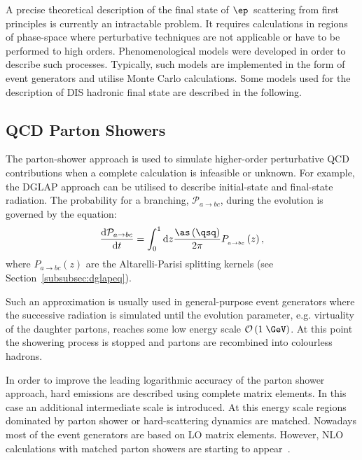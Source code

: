 A precise theoretical description of the final state of $\ep$~scattering from first principles is currently an intractable problem. It requires calculations in regions of phase-space where perturbative techniques are not applicable or have to be performed to high orders. Phenomenological models were developed in order to describe such processes. Typically, such models are implemented in the form of event generators and utilise Monte Carlo calculations. Some models used for the description of DIS hadronic final state are described in the following.
\subsection{QCD Parton Showers}
\label{sec:qcdpartonshower}
The parton-shower approach is used to simulate higher-order perturbative QCD contributions when a complete calculation is infeasible or unknown. For example, the DGLAP approach can be utilised to describe initial-state and final-state radiation. The probability for a branching, $\mathcal{P}_{a\rightarrow bc}$, during the evolution is governed by the equation:
\begin{equation}
\frac{\mathrm{d}\mathcal{P}_{a\rightarrow bc}}{\mathrm{d}t} = \int_0^1{\mathrm{d}z\frac{\as\left(\qsq\right)}{2\pi}P_{_{a\rightarrow bc}}}\left(z\right),
\end{equation}
where $P_{a\rightarrow bc}\left(z\right)$ are the Altarelli-Parisi splitting kernels (see Section~\ref{subsubsec:dglapeq}).

Such an approximation is usually used in general-purpose event generators where the successive radiation is simulated until the evolution parameter, e.g. virtuality of the daughter partons, reaches some low energy scale $\mathcal{O}\left(1\;\GeV\right)$. At this point the showering process is stopped and partons are recombined into colourless hadrons.

In order to improve the leading logarithmic accuracy of the parton shower approach, hard emissions are described using complete matrix elements. In this case an additional intermediate scale is introduced. At this energy scale regions dominated by parton shower or hard-scattering dynamics are matched. Nowadays most of the event generators are based on LO matrix elements. However, NLO calculations with matched parton showers are starting to appear~\cite{Frixione:2007vw,Frixione:2002ik}.

